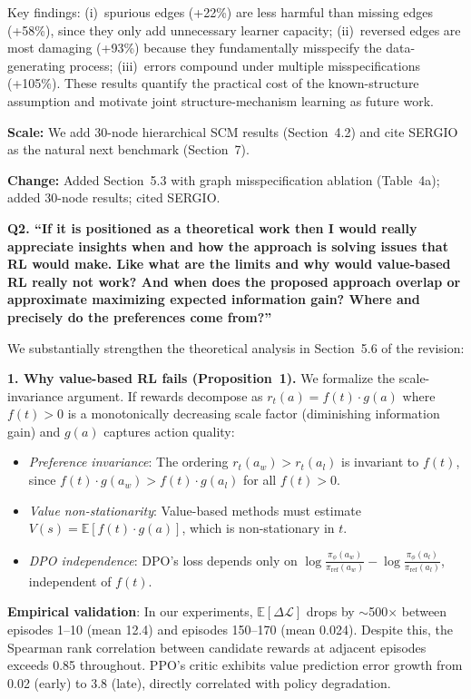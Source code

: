 \documentclass[11pt]{article}
\newcommand{\reviewer}[1]{\vspace{0.8em}\noindent\textbf{\textcolor{reviewercolor}{#1}}}
\newcommand{\response}{\vspace{0.3em}\noindent\textcolor{responsecolor}}
\newcommand{\change}[1]{\textcolor{changecolor}{\textbf{Change:} #1}}
\begin{document}
Key findings: (i)~spurious edges (+22\%) are less harmful than missing edges (+58\%), since they only add unnecessary learner capacity; (ii)~reversed edges are most damaging (+93\%) because they fundamentally misspecify the data-generating process; (iii)~errors compound under multiple misspecifications (+105\%). These results quantify the practical cost of the known-structure assumption and motivate joint structure-mechanism learning as future work.

\textbf{Scale:} We add 30-node hierarchical SCM results (Section~4.2) and cite SERGIO as the natural next benchmark (Section~7).

\change{Added Section~5.3 with graph misspecification ablation (Table~4a); added 30-node results; cited SERGIO.}

\reviewer{Q2. ``If it is positioned as a theoretical work then I would really appreciate insights when and how the approach is solving issues that RL would make. Like what are the limits and why would value-based RL really not work? And when does the proposed approach overlap or approximate maximizing expected information gain? Where and precisely do the preferences come from?''}

\response We substantially strengthen the theoretical analysis in Section~5.6 of the revision:

\textbf{1. Why value-based RL fails (Proposition~1).} We formalize the scale-invariance argument. If rewards decompose as $r_t(a) = f(t) \cdot g(a)$ where $f(t) > 0$ is a monotonically decreasing scale factor (diminishing information gain) and $g(a)$ captures action quality:
\begin{itemize}[nosep]
\item \emph{Preference invariance}: The ordering $r_t(a_w) > r_t(a_l)$ is invariant to $f(t)$, since $f(t) \cdot g(a_w) > f(t) \cdot g(a_l)$ for all $f(t) > 0$.
\item \emph{Value non-stationarity}: Value-based methods must estimate $V(s) = \mathbb{E}[f(t) \cdot g(a)]$, which is non-stationary in $t$.
\item \emph{DPO independence}: DPO's loss depends only on $\log \frac{\pi_\phi(a_w)}{\pi_{\text{ref}}(a_w)} - \log \frac{\pi_\phi(a_l)}{\pi_{\text{ref}}(a_l)}$, independent of $f(t)$.
\end{itemize}

\textbf{Empirical validation}: In our experiments, $\mathbb{E}[\Delta\mathcal{L}]$ drops by $\sim$500$\times$ between episodes 1--10 (mean 12.4) and episodes 150--170 (mean 0.024). Despite this, the Spearman rank correlation between candidate rewards at adjacent episodes exceeds 0.85 throughout. PPO's critic exhibits value prediction error growth from 0.02 (early) to 3.8 (late), directly correlated with policy degradation.
\end{document}
